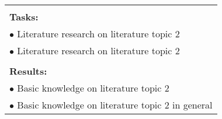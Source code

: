 \begin{table}[!h]
\begin{center}
\begin{tabular}{|p{}||p{}|p{}||p{}|}
            \multicolumn{4}{|p{.95\columnwidth}|}{}\\
            \multicolumn{4}{|p{.95\columnwidth}|}{\textbf{Tasks:}}\\
            \multicolumn{4}{|p{.95\columnwidth}|}{$\bullet$ Literature research on literature topic 2}\\
            \multicolumn{4}{|p{.95\columnwidth}|}{$\bullet$ Literature research on literature topic 2}\\
            \multicolumn{4}{|p{.95\columnwidth}|}{}\\
            \multicolumn{4}{|p{.95\columnwidth}|}{\textbf{Results:}}\\
            \multicolumn{4}{|p{.95\columnwidth}|}{$\bullet$ Basic knowledge on literature topic 2}\\
            \multicolumn{4}{|p{.95\columnwidth}|}{$\bullet$ Basic knowledge on literature topic 2 in general}\\
            \hline
        \end{tabular}
    \end{center}
\end{table}

\clearpage

